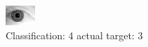 \begin{figure}[h!]
\begin{center}
\includegraphics[width=0.60\columnwidth]{figures/ID2149_class_4_target_3.png}
\end{center}
\caption{ Classification: 4 actual target: 3}
\label{fig:ID2149_class_4_target_3}
\end{figure}
